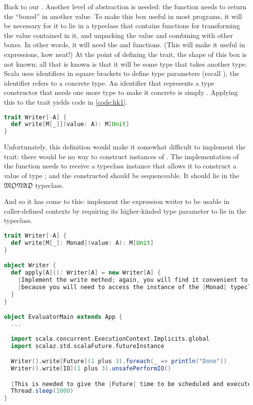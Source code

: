 \documentclass[10 pt]{article}
\begin{document}
Back to our . Another level of abstraction is needed: the  function needs to return the \pcode{()} ``boxed'' in another value. To make this box useful in most programs, it will be necessary for it to lie in a typeclass that contains functions for transforming the value contained in it, and unpacking the value and combining with other boxes. In other words, it will need the  and  functions. (This will make it useful in  expressions, how neat!) At the point of defining the  trait, the shape of this box is not known; all that is known is that it will be some type that takes another type. Scala uses identifiers in square brackets to define type parameters (recall ), the identifier  refers to a concrete type. An identifier that represents a type constructor that needs one more type to make it concrete is simply . Applying this to the  trait yields code in \autoref{code:hk1}.

\begin{lstlisting}[caption={Defining and using higher-kinded types}, label={code:hk1}, language=Scala, escapechar=|]
trait Writer[-A] {
  def write[M[_]](value: A): M[Unit]
}
\end{lstlisting}

Unfortunately, this definition would make it somewhat difficult to implement the trait: there would be no way to construct instances of . The implementation of the  function needs to receive a typeclass instance that allows it to construct a value of type ; and the constructed  should be sequenceable. It should lie in the $\mathfrak{MONAD}$ typeclass. 

\begin{example}
And so it has come to this: implement the expression writer to be usable in caller-defined contexts by requiring its higher-kinded type parameter  to lie in the  typeclass.

\begin{lstlisting}[caption={Reader and Writer with proper variance}, label={code:rw2}, language=Scala, escapechar=|]
trait Writer[-A] {
  def write[M[_]: Monad](value: A): M[Unit]
}

object Writer {
  def apply[A](): Writer[A] = new Writer[A] {
    |Implement the write method; again, you will find it convenient to use the full implicit syntax,|
    |because you will need to access the instance of the |Monad| typeclass for the [higher-kinded] type |M|.|
  }
}

object EvaluatorMain extends App {
  ...
  
  import scala.concurrent.ExecutionContext.Implicits.global
  import scalaz.std.scalaFuture.futureInstance

  Writer().write[Future](1 plus 3).foreach(_ => println("Done"))
  Writer().write[IO](1 plus 3).unsafePerformIO()

  |This is needed to give the |Future| time to be scheduled and executed.|
  Thread.sleep(1000)
}
\end{lstlisting}
\end{example}
\end{document}
